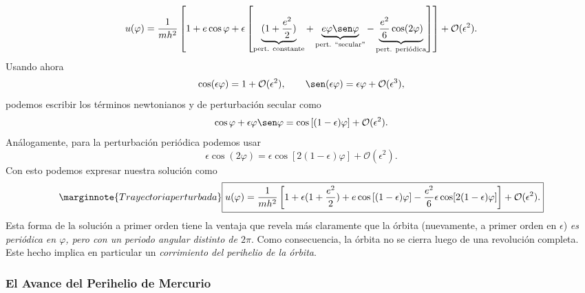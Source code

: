\begin{equation}\label{solucasi}
 u(\varphi)=\frac{1}{mh^2}\left[1+e\cos\varphi+\epsilon\left[\underbrace{
(1+\frac { e^2 } { 2 } )}_\text{pert.
constante}+\underbrace{e\varphi\sen\varphi}_\text{pert. ``secular''}
-\underbrace{\frac{e^2 }{6} \cos(2\varphi)}_\text{pert. periódica}\right ]
\right ] +\mathcal{O}(\epsilon^2).
\end{equation}
Usando ahora
\begin{equation}
 \cos(\epsilon\varphi) =1+\mathcal{O}(\epsilon^2), \qquad
\sen(\epsilon\varphi) =\epsilon\varphi+\mathcal{O}(\epsilon^3),
\end{equation}
podemos escribir los términos newtonianos y de perturbación secular como
\begin{equation}
 \cos\varphi+\epsilon\varphi\sen\varphi=\cos\left[(1-\epsilon)\varphi\right]
+\mathcal{O}(\epsilon^2).
\end{equation}
Análogamente, para la perturbación periódica podemos usar
\begin{equation}
 \epsilon\cos(2\varphi)=\epsilon\cos\left[2(1-\epsilon)\varphi\right]+\mathcal{O}(\epsilon^2).
\end{equation}
Con esto podemos expresar nuestra solución como
\begin{equation}\marginnote{Trayectoria perturbada}
 \boxed{u(\varphi)=\frac{1}{mh^2}\left[1+\epsilon(1+\frac { e^2 } { 2 }
)+e\cos\left[(1-\epsilon)\varphi\right] -\frac { e^2
}{6}\epsilon\cos[2(1-\epsilon)\varphi]\right ] +\mathcal{O}(\epsilon^2).} \label{solu1}
\end{equation}
Esta forma de la solución a primer orden tiene la ventaja que revela más claramente que la órbita (nuevamente, a primer orden en $\epsilon$) \textit{es periódica en $\varphi$, pero con un periodo angular distinto de $2\pi$}. Como consecuencia, la órbita no se cierra luego de una revolución completa. Este hecho implica en particular un \textit{corrimiento del perihelio de la órbita}.

\subsubsection{El Avance del Perihelio de Mercurio}

